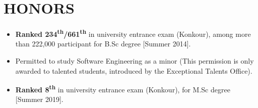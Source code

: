 \documentclass[10pt,a4paper,sans]{moderncv} %
\begin{document}
\section{HONORS}

\begin{itemize}
	
	\item \textbf{Ranked 234\textsuperscript{th}/661\textsuperscript{th}} in university entrance exam (Konkour), among more than 222,000
	participant for B.Sc degree [Summer 2014].
	
	\item Permitted to study Software Engineering as a minor (This permission is only awarded to talented students, introduced by the Exceptional Talents Office).
	
	\item \textbf{Ranked 8\textsuperscript{th}} in university entrance exam (Konkour), for M.Sc degree [Summer 2019].
\end{itemize}




\end{document}

